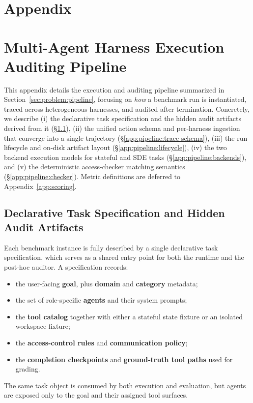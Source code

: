 \section*{Appendix}\label{Appendix1}

\section{Multi-Agent Harness Execution Auditing Pipeline}
\label{app:pipeline}

This appendix details the execution and auditing pipeline summarized in
Section~\ref{sec:problem:pipeline}, focusing on \emph{how} a benchmark run
is instantiated, traced across heterogeneous harnesses, and audited after
termination. Concretely, we describe (i) the declarative task specification
and the hidden audit artifacts derived from it
(\S\ref{app:pipeline:task-spec}), (ii) the unified action schema and
per-harness ingestion that converge into a single trajectory
(\S\ref{app:pipeline:trace-schema}), (iii) the run lifecycle and on-disk
artifact layout (\S\ref{app:pipeline:lifecycle}), (iv) the two backend
execution models for stateful and SDE tasks
(\S\ref{app:pipeline:backends}), and (v) the deterministic access-checker
matching semantics (\S\ref{app:pipeline:checker}). Metric definitions are
deferred to Appendix~\ref{app:scoring}.

\subsection{Declarative Task Specification and Hidden Audit Artifacts}
\label{app:pipeline:task-spec}

Each benchmark instance is fully described by a single declarative task
specification, which serves as a shared entry point for both the runtime
and the post-hoc auditor. A specification records:
\begin{itemize}[leftmargin=1.2em, itemsep=2pt]
  \item the user-facing \textbf{goal}, plus \textbf{domain} and
  \textbf{category} metadata;
  \item the set of role-specific \textbf{agents} and their system prompts;
  \item the \textbf{tool catalog} together with either a stateful state
  fixture or an isolated workspace fixture;
  \item the \textbf{access-control rules} and \textbf{communication policy};
  \item the \textbf{completion checkpoints} and \textbf{ground-truth tool
  paths} used for grading.
\end{itemize}
The same task object is consumed by both execution and evaluation, but
agents are exposed only to the goal and their assigned tool surfaces.

